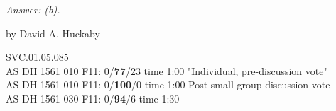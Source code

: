 	
\emph{Answer: (b).}

	by David A. Huckaby

SVC.01.05.085 \\
AS DH 1561 010 F11: 0/{\bf77}/23 time 1:00 "Individual, pre-discussion vote" \\
AS DH 1561 010 F11: 0/{\bf100}/0 time 1:00 Post small-group discussion vote \\
AS DH 1561 030 F11: 0/{\bf94}/6 time 1:30  \\
